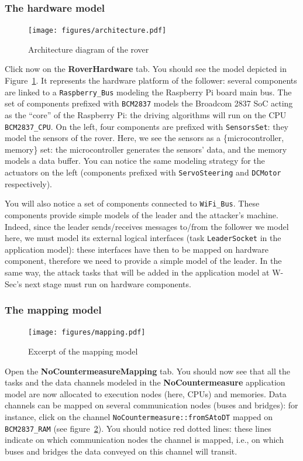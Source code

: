 \documentclass{article}
\begin{document}
\subsubsection{The hardware model}

\begin{figure}
	\hspace*{-1cm}
	\centering
	\texttt{[image: figures/architecture.pdf]}
	\caption{Architecture diagram of the rover}
	\label{fig:roverarchitecture}
\end{figure}

Click now on the \textbf{RoverHardware} tab. You should see the model depicted in Figure~\ref{fig:roverarchitecture}. It represents the hardware platform of the follower: several components are linked to a \texttt{Raspberry\_Bus} modeling the Raspberry Pi board main bus. The set of components prefixed with \texttt{BCM2837} models the Broadcom 2837 SoC acting as the ``core'' of the Raspberry Pi: the driving algorithms will run on the CPU \texttt{BCM2837\_CPU}. On the left, four components are prefixed with \texttt{SensorsSet}: they model the sensors of the rover. Here, we see the sensors as a \{microcontroller, memory\} set: the microcontroller generates the sensors' data, and the memory models a data buffer. You can notice the same modeling strategy for the actuators on the left (components prefixed with \texttt{ServoSteering} and \texttt{DCMotor} respectively).

You will also notice a set of components connected to \texttt{WiFi\_Bus}. These components provide simple models of the leader and the attacker's machine. Indeed, since the leader sends/receives messages to/from the follower we model here, we must model its external logical interfaces (task \texttt{LeaderSocket} in the application model): these interfaces have then to be mapped on hardware component, therefore we need to provide a simple model of the leader. In the same way, the attack tasks that will be added in the application model at W-Sec's next stage must run on hardware components.

\subsubsection{The mapping model}

\begin{figure}
	\centering
	\texttt{[image: figures/mapping.pdf]}
	\caption{Excerpt of the mapping model}
	\label{fig:rovermapping}
\end{figure}
Open the \textbf{NoCountermeasureMapping} tab. You should now see that all the tasks and the data channels modeled in the \textbf{NoCountermeasure} application model are now allocated to execution nodes (here, CPUs) and memories. Data channels can be mapped on several communication nodes (buses and bridges): for instance, click on the channel \texttt{NoCountermeasure::fromSAtoDT} mapped on \texttt{BCM2837\_RAM} (see figure~\ref{fig:rovermapping}). You should notice red dotted lines: these lines indicate on which communication nodes the channel is mapped, i.e., on which buses and bridges the data conveyed on this channel will transit.
\end{document}
